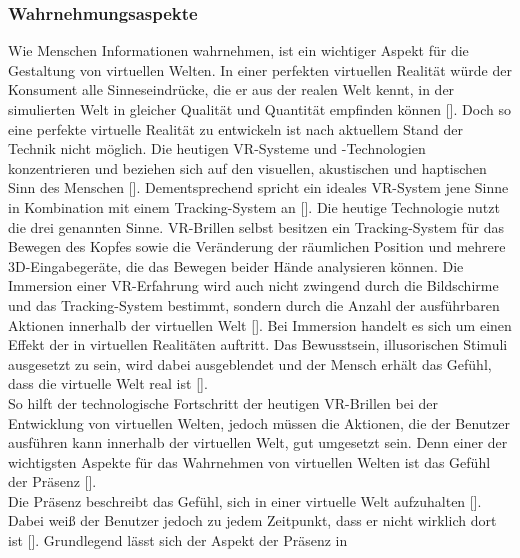 \documentclass[a4paper,12pt,oneside]{article}
\begin{document}
      \subsubsection{Wahrnehmungsaspekte} \label{Wahrnehmungsaspekte}
        Wie Menschen Informationen wahrnehmen, ist ein wichtiger Aspekt für die Gestaltung
        von virtuellen Welten. In einer perfekten virtuellen Realität würde der Konsument
        alle Sinneseindrücke, die er aus der realen Welt kennt, in der simulierten Welt
        in gleicher Qualität und Quantität empfinden können [\cite[17]{Dorner2013}].
        Doch so eine perfekte virtuelle Realität zu entwickeln ist nach aktuellem Stand
        der Technik nicht möglich. Die heutigen VR-Systeme und -Technologien
        konzentrieren und beziehen sich auf den visuellen, akustischen und haptischen Sinn
        des Menschen [\cite[34]{Dorner2013}]. Dementsprechend spricht ein ideales
        VR-System jene Sinne in Kombination mit einem
        Tracking-System an [\cite{Slater2009}]. Die heutige Technologie nutzt die
        drei genannten Sinne. VR-Brillen selbst besitzen ein Tracking-System für das
        Bewegen des Kopfes sowie die Veränderung der räumlichen Position und mehrere 
        3D-Eingabegeräte,
        die das Bewegen beider Hände analysieren können. Die Immersion einer VR-Erfahrung
        wird auch nicht zwingend durch die Bildschirme und das Tracking-System bestimmt,
        sondern durch die Anzahl der ausführbaren Aktionen innerhalb der virtuellen 
        Welt [\cite{Slater2009}]. Bei Immersion handelt es sich um einen Effekt der
        in virtuellen Realitäten auftritt. Das Bewusstsein, illusorischen Stimuli
        ausgesetzt zu sein, wird dabei ausgeblendet und der Mensch erhält das
        Gefühl, dass die virtuelle Welt real ist [\cite[227]{Witmer1998}]. \\
        So hilft der technologische Fortschritt der heutigen VR-Brillen
        bei der Entwicklung von virtuellen Welten, jedoch müssen die Aktionen, die
        der Benutzer ausführen kann innerhalb der virtuellen Welt, gut umgesetzt sein. 
        Denn einer der wichtigsten Aspekte
        für das Wahrnehmen von virtuellen Welten ist das Gefühl der 
        Präsenz [\cite{Slater2009}]. \\
        Die Präsenz beschreibt das Gefühl, sich in einer virtuelle Welt aufzuhalten [\cite{Slater2009}]. 
        Dabei weiß der Benutzer jedoch zu jedem Zeitpunkt, dass er
        nicht wirklich dort ist [\cite{Slater2009}]. Grundlegend lässt sich der 
        Aspekt der Präsenz in
\end{document}
